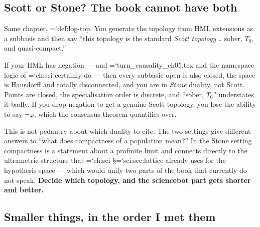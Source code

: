 \documentclass[11pt,letterpaper]{article}
\newcommand{\loc}[1]{{\small\ttfamily\color{accent}\hyphenchar\font=`\-\relax #1}}
\newcommand{\fnd}[1]{\textbf{\color{warn}#1}}
\begin{document}
\subsection*{Scott or Stone? The book cannot have both}

Same chapter, \loc{def:log-top}. You generate the topology from HML
extensions as a subbasis and then say ``this topology is the standard
\emph{Scott topology}\,\ldots{} sober, $T_0$, and quasi-compact.''

If your HML has negation --- and \loc{turn\_causality\_ch05.tex} and the
namespace logic of \loc{ch:sci} certainly do --- then every subbasic
open is also closed, the space is Hausdorff and totally disconnected,
and you are in \emph{Stone} duality, not Scott. Points are closed, the
specialisation order is discrete, and ``sober, $T_0$'' understates it
badly. If you drop negation to get a genuine Scott topology, you lose
the ability to say $\neg\varphi$, which the consensus theorem quantifies
over.

This is not pedantry about which duality to cite. The two settings give
different answers to ``what does compactness of a population mean?''
In the Stone setting compactness is a statement about a profinite
limit and connects directly to the ultrametric structure that
\loc{ch:sci} \S\loc{sci:sec:lattice} already uses for the hypothesis
space --- which would unify two parts of the book that currently do not
speak. \fnd{Decide which topology, and the sciencebot part gets shorter
and better.}

\subsection*{Smaller things, in the order I met them}
\end{document}
